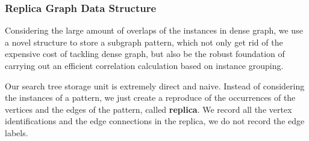 \subsubsection{Replica Graph Data Structure}
\label{subsubsec:replica-ds}
Considering the large amount of overlaps of the instances in dense graph, we use a novel structure to store a subgraph pattern, which not only get rid of the expensive cost of tackling dense graph, but also be the robust foundation of carrying out an efficient correlation calculation based on instance grouping.
\par Our search tree storage unit is extremely direct and naive. Instead of considering the instances of a pattern, we just create a reproduce of the occurrences of the vertices and the edges of the pattern, called {\bf replica}. We record all the vertex identifications and the edge connections in the replica, we do not record the edge labels.
